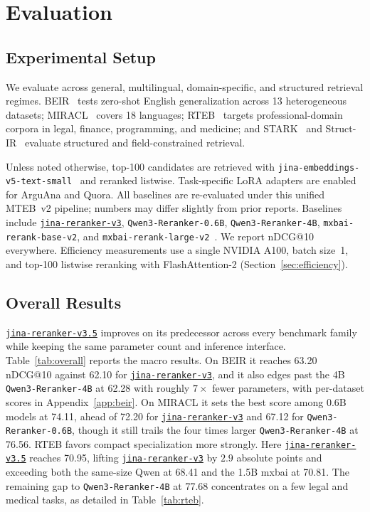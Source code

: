 \documentclass{article}
\newcommand{\jrrvthree}{\href{https://huggingface.co/jinaai/jina-reranker-v3}{\texttt{jina-reranker-v3}}}
\newcommand{\jrrvthreefive}{\href{https://huggingface.co/jinaai/jina-reranker-v3.5}{\texttt{jina-reranker-v3.5}}}
\newcommand{\qwenrerankersmall}{\texttt{Qwen3-Reranker-0.6B}}
\newcommand{\qwenrankerlarge}{\texttt{Qwen3-Reranker-4B}}
\newcommand{\jinaembedsmall}{\texttt{jina-embeddings-v5-text-small}}
\newcommand{\mxbaibase}{\texttt{mxbai-rerank-base-v2}}
\newcommand{\mxbailarge}{\texttt{mxbai-rerank-large-v2}}
\begin{document}
\section{Evaluation}
\label{sec:evaluation}

\subsection{Experimental Setup}
\label{sec:setup}

We evaluate across general, multilingual, domain-specific, and structured retrieval regimes.
BEIR~\cite{thakur2021beir} tests zero-shot English generalization across 13 heterogeneous datasets; MIRACL~\cite{zhang2022miracl} covers 18 languages; RTEB~\cite{rteb2025} targets professional-domain corpora in legal, finance, programming, and medicine; and STARK~\cite{stark} and Struct-IR~\cite{ssrb} evaluate structured and field-constrained retrieval.

Unless noted otherwise, top-100 candidates are retrieved with \jinaembedsmall{}~\cite{akram2026jinaembeddingsv5texttasktargetedembeddingdistillation} and reranked listwise.
Task-specific LoRA adapters are enabled for ArguAna and Quora.
All baselines are re-evaluated under this unified MTEB~v2 pipeline; numbers may differ slightly from prior reports.
Baselines include \jrrvthree{}, \qwenrerankersmall{}, \qwenrankerlarge{}, \mxbaibase{}, and \mxbailarge{}~\cite{shakir2025mxbairerankv2,yang2025qwen3embedding}.
We report nDCG@10 everywhere.
Efficiency measurements use a single NVIDIA A100, batch size~1, and top-100 listwise reranking with FlashAttention-2 (Section~\ref{sec:efficiency}).

\subsection{Overall Results}
\label{sec:overall}

\jrrvthreefive{} improves on its predecessor across every benchmark family while keeping the same parameter count and inference interface. Table~\ref{tab:overall} reports the macro results. On BEIR it reaches 63.20 nDCG@10 against 62.10 for \jrrvthree{}, and it also edges past the 4B \qwenrankerlarge{} at 62.28 with roughly $7\times$ fewer parameters, with per-dataset scores in Appendix~\ref{app:beir}. On MIRACL it sets the best score among 0.6B models at 74.11, ahead of 72.20 for \jrrvthree{} and 67.12 for \qwenrerankersmall{}, though it still trails the four times larger \qwenrankerlarge{} at 76.56. RTEB favors compact specialization more strongly. Here \jrrvthreefive{} reaches 70.95, lifting \jrrvthree{} by $2.9$ absolute points and exceeding both the same-size Qwen at 68.41 and the 1.5B mxbai at 70.81. The remaining gap to \qwenrankerlarge{} at 77.68 concentrates on a few legal and medical tasks, as detailed in Table~\ref{tab:rteb}.
\end{document}
